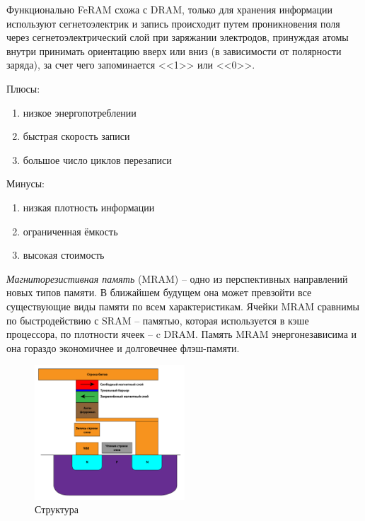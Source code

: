 Функционально FeRAM схожа с DRAM, только для хранения информации 
используют сегнетоэлектрик и запись происходит путем проникновения 
поля через сегнетоэлектрический слой при заряжании электродов,
принуждая атомы внутри принимать ориентацию вверх или вниз 
(в зависимости от полярности заряда), за счет чего запоминается 
<<1>> или <<0>>. \\

\hspace{-5ex}\begin{minipage}[h]{0.5\linewidth}
\vspace{2ex}Плюсы:
\begin{enumerate}[noitemsep]
	\item низкое энергопотреблении
	\item быстрая скорость записи
	\item большое число циклов перезаписи
\end{enumerate}
\end{minipage}
\begin{minipage}[h]{0.5\linewidth}
Минусы:
\begin{enumerate}[noitemsep]
	\item низкая плотность информации 
	\item ограниченная ёмкость
	\item высокая стоимость
\end{enumerate}
\end{minipage}

\pagebreak

\emph{Магниторезистивная память} (MRAM) -- одно из перспективных направлений 
новых типов памяти. В ближайшем будущем она может превзойти все 
существующие виды памяти по всем характеристикам. Ячейки MRAM сравнимы по 
быстродействию с SRAM -- памятью, которая используется в кэше процессора, 
по плотности ячеек -- c DRAM. Память MRAM энергонезависима и она гораздо 
экономичнее и долговечнее флэш-памяти.

\begin{figure}
   \vspace{-2ex}
    \includegraphics[width=0.5\textwidth]{images/image_03}
    \parbox{0.5\textwidth}{\caption{Структура}}
\end{figure}

